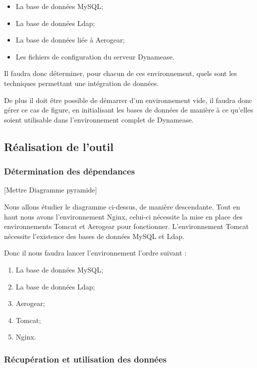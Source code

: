 \begin{itemize}
	\item La base de données MySQL;
	\item La base de données Ldap;
	\item La base de données liée à Aerogear;
	\item Les fichiers de configuration du serveur Dynamease.
\end{itemize}

Il faudra donc déterminer, pour chacun de ces environnement, quels sont les techniques permettant une intégration de données.

De plus il doit être possible de démarrer d'un environnement vide, il faudra donc gérer ce cas de figure, en initialisant les bases de données de manière à ce qu'elles soient utilisable dans l'environnement complet de Dynamease.

\subsection{Réalisation de l'outil}

\subsubsection{Détermination des dépendances}

[Mettre Diagramme pyramide]

Nous allons étudier le diagramme ci-dessus, de manière descendante. Tout en haut nous avons l'environnement Nginx, celui-ci nécessite la mise en place des environnements Tomcat et Aerogear pour fonctionner. L'environnement Tomcat nécessite l'existence des bases de données MySQL et Ldap. 

Donc il nous faudra lancer l'environnement l'ordre suivant :

\begin{enumerate}
	\item La base de données MySQL;
	\item La base de données Ldap;
	\item Aerogear;
	\item Tomcat;
	\item Nginx.
\end{enumerate}

\subsubsection{Récupération et utilisation des données}


